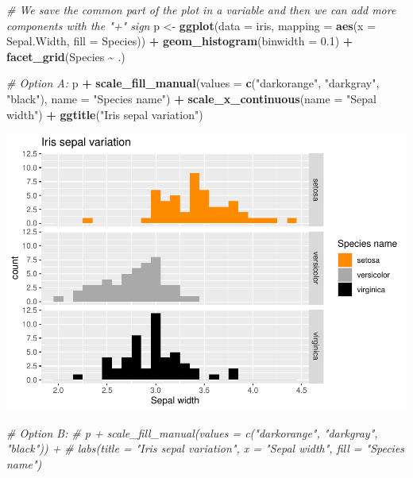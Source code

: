 \documentclass[
]{article}
\newenvironment{Shaded}{\begin{snugshade}}{\end{snugshade}}
\newcommand{\AttributeTok}[1]{\textcolor[rgb]{0.13,0.29,0.53}{#1}}
\newcommand{\CommentTok}[1]{\textcolor[rgb]{0.56,0.35,0.01}{\textit{#1}}}
\newcommand{\FloatTok}[1]{\textcolor[rgb]{0.00,0.00,0.81}{#1}}
\newcommand{\FunctionTok}[1]{\textcolor[rgb]{0.13,0.29,0.53}{\textbf{#1}}}
\newcommand{\NormalTok}[1]{#1}
\newcommand{\OtherTok}[1]{\textcolor[rgb]{0.56,0.35,0.01}{#1}}
\newcommand{\SpecialCharTok}[1]{\textcolor[rgb]{0.81,0.36,0.00}{\textbf{#1}}}
\newcommand{\StringTok}[1]{\textcolor[rgb]{0.31,0.60,0.02}{#1}}
\begin{document}
\begin{Shaded}
\begin{Highlighting}[]
\CommentTok{\# We save the common part of the plot in a variable and then we can add more components with the "+" sign}
\NormalTok{p }\OtherTok{\textless{}{-}} \FunctionTok{ggplot}\NormalTok{(}\AttributeTok{data =}\NormalTok{ iris, }\AttributeTok{mapping =} \FunctionTok{aes}\NormalTok{(}\AttributeTok{x =}\NormalTok{ Sepal.Width, }\AttributeTok{fill =}\NormalTok{ Species)) }\SpecialCharTok{+}
  \FunctionTok{geom\_histogram}\NormalTok{(}\AttributeTok{binwidth =} \FloatTok{0.1}\NormalTok{) }\SpecialCharTok{+}
  \FunctionTok{facet\_grid}\NormalTok{(Species }\SpecialCharTok{\textasciitilde{}}\NormalTok{ .)}

\CommentTok{\# Option A:}
\NormalTok{p }\SpecialCharTok{+} \FunctionTok{scale\_fill\_manual}\NormalTok{(}\AttributeTok{values =} \FunctionTok{c}\NormalTok{(}\StringTok{"darkorange"}\NormalTok{, }\StringTok{"darkgray"}\NormalTok{, }\StringTok{"black"}\NormalTok{), }\AttributeTok{name =} \StringTok{"Species name"}\NormalTok{) }\SpecialCharTok{+}
  \FunctionTok{scale\_x\_continuous}\NormalTok{(}\AttributeTok{name =} \StringTok{"Sepal width"}\NormalTok{) }\SpecialCharTok{+} 
  \FunctionTok{ggtitle}\NormalTok{(}\StringTok{"Iris sepal variation"}\NormalTok{)}
\end{Highlighting}
\end{Shaded}

\begin{center}\includegraphics{P1_exercises_files/figure-latex/titles-ggplot2-1} \end{center}

\begin{Shaded}
\begin{Highlighting}[]
\CommentTok{\# Option B:}
\CommentTok{\# p + scale\_fill\_manual(values = c("darkorange", "darkgray", "black")) +}
\CommentTok{\#   labs(title = "Iris sepal variation", x = "Sepal width", fill = "Species name")}
\end{Highlighting}
\end{Shaded}
\end{document}
